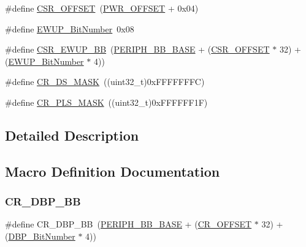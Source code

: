 \begin{DoxyCompactItemize}
\item 
\#define \mbox{\hyperlink{group___p_w_r___private___defines_ga984cbe73312b6d3d355c5053763d499a}{C\+S\+R\+\_\+\+O\+F\+F\+S\+ET}}~(\mbox{\hyperlink{group___p_w_r___private___defines_ga7f88bce73931300319824f22578f90de}{P\+W\+R\+\_\+\+O\+F\+F\+S\+ET}} + 0x04)
\item 
\#define \mbox{\hyperlink{group___p_w_r___private___defines_ga94fe0520e8f9b71fa2b99c0565ec70ea}{E\+W\+U\+P\+\_\+\+Bit\+Number}}~0x08
\item 
\#define \mbox{\hyperlink{group___p_w_r___private___defines_gaaff864595f697850b19173b0bca991b0}{C\+S\+R\+\_\+\+E\+W\+U\+P\+\_\+\+BB}}~(\mbox{\hyperlink{group___peripheral__memory__map_gaed7efc100877000845c236ccdc9e144a}{P\+E\+R\+I\+P\+H\+\_\+\+B\+B\+\_\+\+B\+A\+SE}} + (\mbox{\hyperlink{group___r_c_c___private___defines_ga984cbe73312b6d3d355c5053763d499a}{C\+S\+R\+\_\+\+O\+F\+F\+S\+ET}} $\ast$ 32) + (\mbox{\hyperlink{group___p_w_r___private___defines_ga94fe0520e8f9b71fa2b99c0565ec70ea}{E\+W\+U\+P\+\_\+\+Bit\+Number}} $\ast$ 4))
\item 
\#define \mbox{\hyperlink{group___p_w_r___private___defines_ga8ee6bf9218f3c476629dd9ee70deef21}{C\+R\+\_\+\+D\+S\+\_\+\+M\+A\+SK}}~((uint32\+\_\+t)0x\+F\+F\+F\+F\+F\+F\+F\+C)
\item 
\#define \mbox{\hyperlink{group___p_w_r___private___defines_gac4a30eebdd1d292331a578b189962e77}{C\+R\+\_\+\+P\+L\+S\+\_\+\+M\+A\+SK}}~((uint32\+\_\+t)0x\+F\+F\+F\+F\+F\+F1\+F)
\end{DoxyCompactItemize}


\subsection{Detailed Description}


\subsection{Macro Definition Documentation}
\mbox{\label{group___p_w_r___private___defines_ga799ab60bdbcfc1076cf2d7f206d09b0c}} 
\subsubsection{\texorpdfstring{CR\_DBP\_BB}{CR\_DBP\_BB}}
{\footnotesize\ttfamily \#define C\+R\+\_\+\+D\+B\+P\+\_\+\+BB~(\mbox{\hyperlink{group___peripheral__memory__map_gaed7efc100877000845c236ccdc9e144a}{P\+E\+R\+I\+P\+H\+\_\+\+B\+B\+\_\+\+B\+A\+SE}} + (\mbox{\hyperlink{group___r_c_c___private___defines_gafa1d3d0ea72132df651c76fc1bdffffc}{C\+R\+\_\+\+O\+F\+F\+S\+ET}} $\ast$ 32) + (\mbox{\hyperlink{group___p_w_r___private___defines_ga36ff45d972bf94f31f172fd53cf44d23}{D\+B\+P\+\_\+\+Bit\+Number}} $\ast$ 4))}

